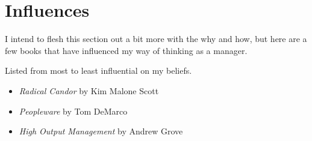 \documentclass[11pt]{amsart}
\begin{document}
\section*{Influences}

I intend to flesh this section out a bit more with the why and how, but here are a few books that have influenced my way of thinking as a manager.

Listed from most to least influential on my beliefs.

\begin{itemize}
  \item \emph{Radical Candor} by Kim Malone Scott 
  \item \emph{Peopleware} by Tom DeMarco
  \item \emph{High Output Management} by Andrew Grove
\end{itemize}
\end{document}
